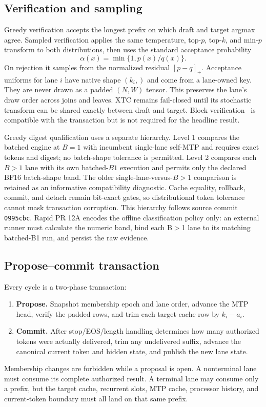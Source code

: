 \documentclass[10pt,twocolumn]{article}
\begin{document}
\subsection{Verification and sampling}
Greedy verification accepts the longest prefix on which draft and target
argmax agree.  Sampled verification applies the same temperature, top-$p$,
top-$k$, and min-$p$ transform to both distributions, then uses the standard
acceptance probability
\begin{equation}
  \alpha(x)=\min\{1,p(x)/q(x)\}.
\end{equation}
On rejection it samples from the normalized residual
$[p-q]_+$.  Acceptance uniforms for lane $i$ have native shape $(k_i,)$ and
come from a lane-owned key.  They are never drawn as a padded $(N,W)$ tensor.
This preserves the lane's draw order across joins and leaves.  XTC remains
fail-closed until its stochastic transform can be shared exactly between
draft and target.  Block verification~\cite{sun2024} is compatible with the
transaction but is not required for the headline result.

Greedy digest qualification uses a separate hierarchy.  Level 1 compares the
batched engine at $B=1$ with incumbent single-lane self-MTP and requires exact
tokens and digest; no batch-shape tolerance is permitted.  Level 2 compares
each $B>1$ lane with its own batched-$B1$ execution and permits only the
declared BF16 batch-shape band.  The older single-lane-versus-$B>1$ comparison
is retained as an informative compatibility diagnostic.  Cache equality,
rollback, commit, and detach remain bit-exact gates, so distributional token
tolerance cannot mask transaction corruption.  This hierarchy follows source
commit \texttt{0995cbc}.  Rapid PR 12A encodes the offline classification
policy only: an external runner must calculate the numeric band, bind each
B$>$1 lane to its matching batched-B1 run, and persist the raw evidence.

\subsection{Propose--commit transaction}
Every cycle is a two-phase transaction:
\begin{enumerate}
  \item \textbf{Propose.} Snapshot membership epoch and lane order, advance
        the MTP head, verify the padded rows, and trim each target-cache row by
        $k_i-a_i$.
  \item \textbf{Commit.} After stop/EOS/length handling determines how many
        authorized tokens were actually delivered, trim any undelivered
        suffix, advance the canonical current token and hidden state, and
        publish the new lane state.
\end{enumerate}
Membership changes are forbidden while a proposal is open.  A nonterminal
lane must consume its complete authorized result.  A terminal lane may consume
only a prefix, but the target cache, recurrent slots, MTP cache, processor
history, and current-token boundary must all land on that same prefix.
\end{document}
